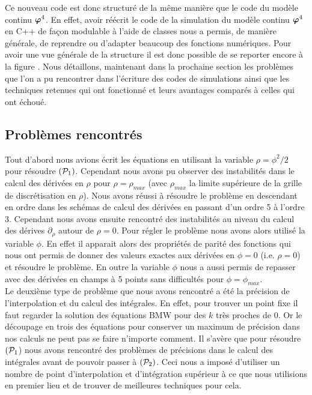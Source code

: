 \documentclass[10.5pt]{article}
\begin{document}
\begin{multicols}{2}
Ce nouveau code est donc structuré de la même manière que le code du modèle continu $\boldsymbol{ \varphi}^4$. En effet, avoir réécrit le code de la simulation du modèle continu $\boldsymbol{ \varphi}^4$ en C++ de façon modulable à l'aide de classes nous a permis, de manière générale, de reprendre ou d'adapter beaucoup des fonctions numériques. Pour avoir une vue générale de la structure il est donc possible de se reporter encore à la figure . Nous détaillons, maintenant dans la prochaine section les problèmes que l'on a pu rencontrer dans l'écriture des codes de simulations ainsi que les techniques retenues qui ont fonctionné et leurs avantages comparés à celles qui ont échoué. \\





\subsection{Problèmes rencontrés}

\label{sec:Problemes}

Tout d'abord nous avions écrit les équations en utilisant la variable $\rho = \phi^2/2$ pour résoudre $(\mathcal{P}_1)$. Cependant nous avons pu observer des instabilités dans le calcul des dérivées en $\rho$ pour $\rho = \rho_{max}$ (avec $\rho_{max}$ la limite supérieure de la grille de discrétisation en $\rho$). Nous avons réussi à résoudre le problème en descendant en ordre dans les schémas de calcul des dérivées en passant d'un ordre 5 à l'ordre 3. Cependant nous avons ensuite rencontré des instabilités au niveau du calcul des dérives $\partial_{\rho}$ autour de $\rho = 0$. Pour régler le problème nous avons alors utilisé la variable $\phi$. En effet il apparait alors des propriétés de parité des fonctions qui nous ont permis de donner des valeurs exactes aux dérivées en $\phi = 0$ (i.e. $\rho = 0$) et résoudre le problème. En outre la variable $\phi$ nous a aussi permis de repasser avec des dérivées en champs à 5 points sans difficultés pour $\phi = \phi_{max}$. \\

Le deuxième type de problème que nous avons rencontré a été la précision de l'interpolation et du calcul des intégrales. En effet, pour trouver un point fixe il faut regarder la solution des équations BMW pour des $k$ très proches de 0. Or le découpage en trois des équations pour conserver un maximum de précision dans nos calculs ne peut pas se faire n'importe comment. Il s'avère que pour résoudre $(\mathcal{P}_1$) nous avons rencontré des problèmes de précisions dans le calcul des intégrales avant de pouvoir passer à $(\mathcal{P}_2)$. Ceci nous a imposé d'utiliser un nombre de point d'interpolation et d'intégration supérieur à ce que nous utilisions en premier lieu et de trouver de meilleures techniques pour cela. \\




\end{multicols}
\end{document}
